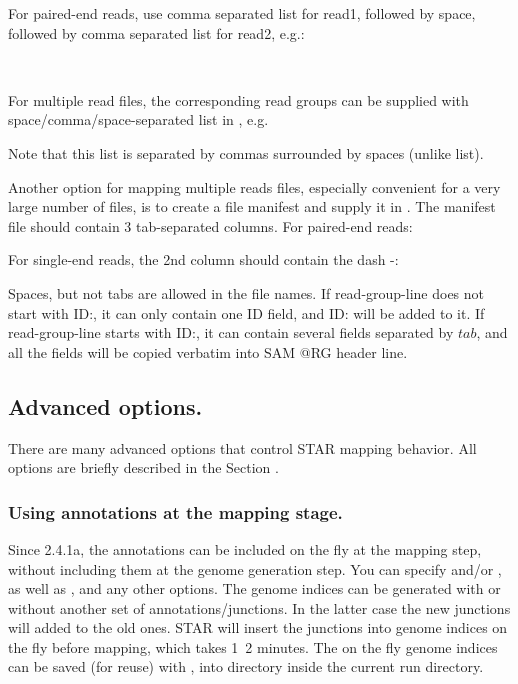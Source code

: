 \documentclass[12pt]{article}
\begin{document}
  

For paired-end reads, use comma separated list 
for read1, followed by space, followed by comma separated list for read2, e.g.:

~

For multiple read files, the corresponding read groups can be supplied with space/comma/space-separated list in , e.g.

 

Note that this list is separated by commas surrounded by spaces (unlike  list).

Another option for mapping multiple reads files, especially convenient for a very large number of files, is to create a file manifest and supply it in  .
The manifest file should contain 3 tab-separated columns. For paired-end reads: 


For single-end reads, the 2nd column should contain the dash -: 


Spaces, but not tabs are allowed in the file names.
If read-group-line does not start with ID:, it can only contain one ID field, and ID: will be added to it.
If read-group-line starts with ID:, it can contain several fields separated by $tab$, and all the fields will be copied verbatim into SAM @RG header line.

\subsection{Advanced options.}
There are many advanced options that control STAR mapping behavior. All options are briefly described in the Section . 

\subsubsection{Using annotations at the mapping stage.}
Since 2.4.1a, the annotations can be included on the fly at the mapping step, without including them at the genome generation step. You can specify   and/or  , as well as , and any other  options. The genome indices can be generated with or  without another set of annotations/junctions. In the latter case the new junctions will added to the old ones. STAR will insert the junctions into genome indices on the fly before mapping, which takes 1~2 minutes. The on the fly genome indices can be saved (for reuse) with  , into  directory inside the current run directory.
\end{document}
